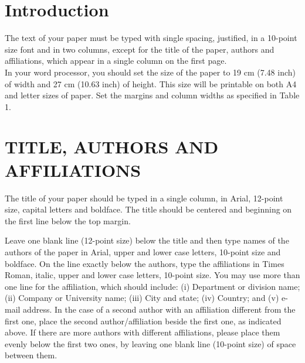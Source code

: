 \documentclass[conference,compsoc]{IEEEtran}
\begin{document}




%

\IEEEpeerreviewmaketitle


\section{Introduction}
The text of your paper must be typed with single spacing, justified, in a 10-point size font and in two columns, except for the title of the paper, authors and affiliations, which appear in a single column on the first page.\\

In your word processor, you should set the size of the paper to 19 cm (7.48 inch) of width and 27 cm (10.63 inch) of height. This size will be printable on both A4 and letter sizes of paper. Set the margins and column widths as specified in Table 1.



\section{TITLE, AUTHORS AND AFFILIATIONS}
The title of your paper should be typed in a single column, in Arial, 12-point size, capital letters and boldface. The title should be centered and beginning on the first line below the top margin.

Leave one blank line (12-point size) below the title and then type names of the authors of the paper in Arial, upper and lower case letters, 10-point size and boldface. On the line exactly below the authors, type the affiliations in Times Roman, italic, upper and lower case letters, 10-point size. You may use more than one line for the affiliation, which should include: (i) Department or division name; (ii) Company or University name; (iii) City and state; (iv) Country; and (v) e-mail address. In the case of a second author with an affiliation different from the first one, place the second author/affiliation beside the first one, as indicated above. If there are more authors with different affiliations, please place them evenly below the first two ones, by leaving one blank line (10-point size) of space between them.
\end{document}

